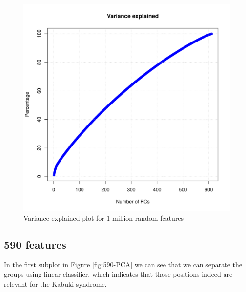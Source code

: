 \begin{figure}[!h]
    \centering
    \includegraphics[width=0.5\columnwidth]{figures/PCA/1m/var_expl.pdf}
    \caption{Variance explained plot for 1 million random features}
    \label{fig:1m-varexpl}
\end{figure}
\FloatBarrier

\subsection{590 features}
In the first subplot in Figure \ref{fig:590-PCA} we can see that we can separate the groups using linear classifier, which indicates that those positions indeed are relevant for the Kabuki syndrome.


